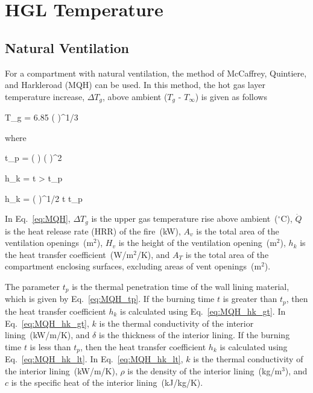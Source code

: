 
\chapter{HGL Temperature}
\label{HGL_Chapter}

\section{Natural Ventilation}

For a compartment with natural ventilation, the method of McCaffrey, Quintiere, and Harkleroad (MQH) can be used. In this method, the hot gas layer temperature increase, $\Delta T_g$, above ambient ($T_g$ - $T_\infty$) is given as follows

\be
\Delta T_g = 6.85 \left(  \right)^{1/3}
\label{eq:MQH}
\ee

\noindent where

\be
t_p = \left(  \right) \left(  \right)^2
\label{eq:MQH_tp}
\ee

\be
h_k =   t > t_p
\label{eq:MQH_hk_gt}
\ee

\be
h_k = \left(  \right)^{1/2}  t \le t_p
\label{eq:MQH_hk_lt}
\ee

In Eq.~\ref{eq:MQH}, $\Delta T_g$ is the upper gas temperature rise above ambient~($^\circ$C), $\dot Q$ is the heat release rate (HRR) of the fire~(kW), $A_v$ is the total area of the ventilation openings~(m$^2$), $H_v$ is the height of the ventilation opening~(m$^2$), $h_k$ is the heat transfer coefficient~(W/m$^2$/K), and $A_T$ is the total area of the compartment enclosing surfaces, excluding areas of vent openings~(m$^2$). 

The parameter $t_p$ is the thermal penetration time of the wall lining material, which is given by Eq.~\ref{eq:MQH_tp}. If the burning time $t$ is greater than $t_p$, then the heat transfer coefficient $h_k$ is calculated using Eq.~\ref{eq:MQH_hk_gt}. In Eq.~\ref{eq:MQH_hk_gt}, $k$ is the thermal conductivity of the interior lining~(kW/m/K), and $\delta$ is the thickness of the interior lining. If the burning time $t$ is less than $t_p$, then the heat transfer coefficient $h_k$ is calculated using Eq.~\ref{eq:MQH_hk_lt}. In Eq.~\ref{eq:MQH_hk_lt}, $k$ is the thermal conductivity of the interior lining~(kW/m/K), $\rho$ is the density of the interior lining~(kg/m$^3$), and $c$ is the specific heat of the interior lining~(kJ/kg/K).


